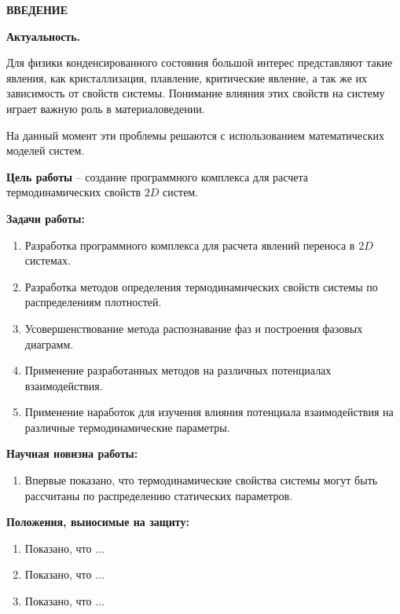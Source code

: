 
\newpage
\begin{center}
\textbf{ВВЕДЕНИЕ}
\end{center}



\textbf{Актуальность.}

Для физики конденсированного состояния большой интерес представляют такие явления, как кристаллизация, плавление, критические явление, а так же их зависимость от свойств системы. Понимание влияния этих свойств на систему играет важную роль в материаловедении.


На данный момент эти проблемы решаются с использованием математических моделей систем.



\textbf{Цель работы} --
создание программного комплекса для расчета термодинамических свойств $2D$ систем.

\textbf{Задачи работы:}
\begin{enumerate}
\item Разработка программного комплекса для расчета явлений переноса в $2D$ системах.
\item Разработка методов определения термодинамических свойств системы по распределениям плотностей. 
\item Усовершенствование метода распознавание фаз и построения фазовых диаграмм.
\item Применение разработанных методов на различных потенциалах взаимодействия.
\item Применение наработок для изучения влияния потенциала взаимодействия на различные термодинамические параметры.
\end{enumerate}

\textbf{Научная новизна работы:}
\begin{enumerate}
\item Впервые показано, что термодинамические свойства системы могут быть рассчитаны по распределению статических параметров.

\end{enumerate}

\textbf{Положения, выносимые на защиту:}
\begin{enumerate}
\item Показано, что ...

\item Показано, что ...

\item Показано, что ...

\end{enumerate}

